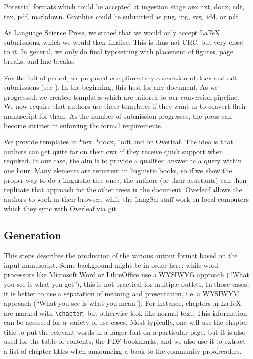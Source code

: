 \documentclass[nonflat,smallfont
]{langsci/langscibook}
\begin{document}
Potential formats which could be accepted at ingestion stage are: txt, docx, odt, tex, pdf, markdown. Graphics could be submitted as png, jpg, svg, idd, or pdf. 


At Language Science Press, we stated that we would only accept \LaTeX\xspace submissions, which we would then finalise. This is thus not CRC, but very close to it. In general, we only do final typesetting with placement of figures, page breaks, and line breaks. 

For the initial period, we proposed complimentary conversion of docx and odt submissions (see ). In the beginning, this held for any document. As we progressed, we created templates which are tailored to our conversion pipeline. We now require that authors use these templates if they want us to convert their manuscript for them. As the number of submission progresses, the press can become stricter in enforcing the formal requirements.  

We provide templates in *tex, *docx, *odt and on Overleaf. The idea is that authors can get quite far on their own if they receive quick support when required. In our case, the aim is to provide a qualified answer to a query within one hour. Many elements are recurrent in linguistic books, so if we show the proper way to do a linguistic tree once, the authors (or their assistants) can then replicate that approach for the other trees in the document. Overleaf allows the authors to work in their browser, while the LangSci staff work on local computers which they sync with Overleaf via git. 


\subsection{Generation}
This steps describes the production of the various output format based on the input manuscript. Some background might be in order here: while word processors like Microsoft Word or LibreOffice use a WYSIWYG approach (``What you see is what you get''), this is not practical for multiple outlets.
In those cases, it is better to use a separation of meaning and presentation, i.e. a WYSIWYM approach (``What you see is what you mean''). For instance, chapters in \LaTeX\xspace are marked with \verb+\chapter+, but otherwise look like normal text. This information can be accessed for a variety of use cases. Most typically, one will use the chapter title to put the relevant words in a larger font on a particular  page, but it is also used for the table of contents, the PDF bookmarks, and we also use it to extract a list of chapter titles when announcing a book to the community proofreaders. 
\end{document}
